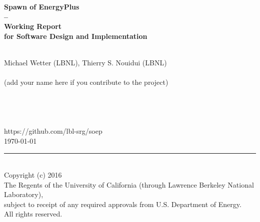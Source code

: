 \begin{titlepage}
\begin{minipage}{\headwidth}
\begin{flushright}
\vspace{-1cm}
\large{~}
\\[5mm]
\hrulefill
\\[5mm]
 \Large\sffamily\bfseries{Spawn of EnergyPlus}\\
 \Large\sffamily\bfseries{--}\\[3mm]
 \Large\sffamily\bfseries{Working Report}\\
 \Large\sffamily\bfseries{for Software Design and Implementation}
\\
\hrulefill
~\\[20mm]
\end{flushright}
\begin{center}
\large{Michael Wetter (LBNL), Thierry S. Nouidui (LBNL)}\\
\large{~}\\
\large{(add your name here if you contribute to the project)}\\
 \large{~}\\
\large{~}\\
\large{~}\\
\large{~}\\
\large{https://github.com/lbl-srg/soep}
~\\[20mm]
\large{\today}
\\[50mm]
\end{center}
\hrule
~\\[2mm]
Copyright (c) 2016\\
The Regents of the University of California
(through Lawrence Berkeley National Laboratory),\\
subject to receipt of any required approvals from U.S. Department of Energy.\\
All rights reserved.
\end{minipage}
\end{titlepage}

